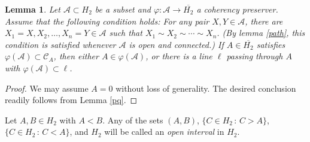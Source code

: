 \documentclass[10pt]{amsart}
\newtheorem{lemma}[theorem]{Lemma}
\theoremstyle{definition}
\theoremstyle{remark}
\numberwithin{subsection}{section}
\numberwithin{equation}{section}
\newcommand\cC{{\mathcal{C}}}
\newcommand\oH{{\overline{H_2}}}
\begin{document}
\begin{lemma}\label{gap}
Let $\mathcal{A}\subset H_2$ be a subset and $\varphi\colon \mathcal{A}\to \oH$ a coherency preserver. 
Assume that the following condition holds: For any pair $X, Y\in \mathcal{A}$, there are $X_1=X, X_2, \ldots, X_n=Y\in \mathcal{A}$ such that $X_1\sim X_2\sim \cdots\sim X_n$.
(By lemma \ref{path}, this condition is satisfied whenever $\mathcal{A}$ is open and connected.)
If $A\in \oH$ satisfies $\varphi(\mathcal{A}) \subset \cC_A$, then either $A\in \varphi(\mathcal{A})$, or there is a line $\ell$ passing through $A$ with $\varphi(\mathcal{A}) \subset \ell$.
\end{lemma}
\begin{proof}
We may assume $A=0$ without loss of generality.
The desired conclusion readily follows from Lemma \ref{pq}.
\end{proof}

Let $A, B \in H_2$ with $A < B$. Any of the sets $(A,B)$, $\{C \in H_2 \, : \, C > A \}$, $\{ C \in H_2 \, :\, C < A \}$, and $H_2$ will be called an \emph{open interval}  in $H_2$. 
\end{document}
